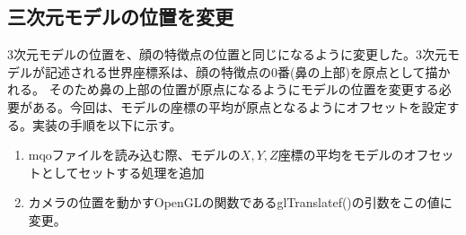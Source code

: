 \documentclass[]{jarticle}          %
\begin{document}
\subsection{三次元モデルの位置を変更}
3次元モデルの位置を、顔の特徴点の位置と同じになるように変更した。3次元モデルが記述される世界座標系は、顔の特徴点の0番(鼻の上部)を原点として描かれる。
そのため鼻の上部の位置が原点になるようにモデルの位置を変更する必要がある。今回は、モデルの座標の平均が原点となるようにオフセットを設定する。実装の手順を以下に示す。
\begin{enumerate}
  \item mqoファイルを読み込む際、モデルの$X,Y,Z$座標の平均をモデルのオフセットとしてセットする処理を追加
  \item カメラの位置を動かすOpenGLの関数であるglTranslatef()の引数をこの値に変更。
\end{enumerate}
\end{document}
